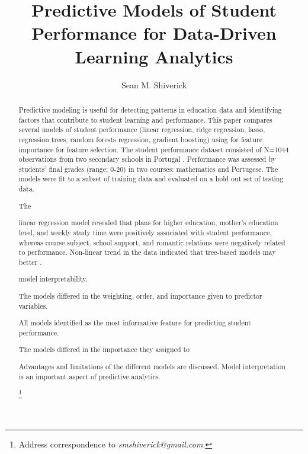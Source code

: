 \documentclass[sigconf]{acmart}
\begin{document}
  \title{Predictive Models of Student Performance for Data-Driven 
  Learning Analytics}
  \author{Sean M. Shiverick}
\renewcommand{\shortauthors}{S.M. Shiverick}


\begin{abstract}

Predictive modeling is useful for detecting patterns in education data and 
identifying factors that contribute to student learning and performance. 
This paper compares several models of student performance (linear regression, 
ridge regression, lasso, regression trees, random forests regression, gradient 
boosting) using for feature importance for feature selection. The student 
performance dataset consisted of N=1044 observations from two secondary schools 
in Portugal \cite{cortez08}. Performance was assessed by students' final grades 
(range; 0-20) in two courses: mathematics and Portugese. The models were fit 
to a subset of training data and evaluated on a hold out set of testing data. 

The 


linear regression model revealed that plans for higher education, mother's 
education level, and weekly study time were positively associated with student 
performance, whereas course subject, school support, and romantic relations
were negatively related to performance. Non-linear trend in the data indicated
that tree-based models may better . 


model interpretability. 

The models differed in the weighting, order, and importance given to predictor
variables. 



All models identified as the most informative feature for predicting 
student performance. 

The models differed in the importance they assigned to

Advantages and limitations of the different models are  discussed. 
Model interpretation is an important aspect of predictive analytics.


\footnote{Address correspondence to \textit{smshiverick@gmail.com}.}

\end{abstract}
\maketitle
\end{document}
